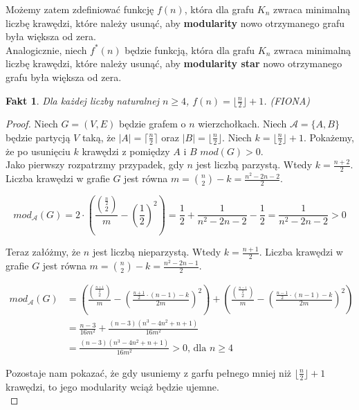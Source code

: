 \documentclass[letterpaper,12pt]{article}
\newtheorem{fact}{Fakt}
\begin{document}
  Możemy zatem zdefiniować funkcję \textbf{\(f(n)\)}, która dla grafu \(K_n\) zwraca minimalną liczbę krawędzi, które należy usunąć, aby \textbf{modularity} nowo otrzymanego grafu była większa od zera.\\

  Analogicznie, niech \textbf{\(f^*(n)\)} będzie funkcją, która dla grafu \(K_n\) zwraca minimalną liczbę krawędzi, które należy usunąć, aby \textbf{modularity star} nowo otrzymanego grafu była większa od zera.\\

  \begin{fact}
    Dla każdej liczby naturalnej \(n \geq 4\), \(f(n) = \lfloor\frac{n}{2}\rfloor + 1\). (FIONA)
  \end{fact}

  \begin{proof}
    Niech \(G=(V,E)\) będzie grafem o \(n\) wierzchołkach. Niech \(\mathcal{A} = \{A, B\}\) będzie partycją \(V\) taką, że \(|A| = \lceil\frac{n}{2}\rceil\) oraz \(|B| = \lfloor\frac{n}{2}\rfloor\). Niech \(k = \lfloor\frac{n}{2}\rfloor + 1\). Pokażemy, że po usunięciu \(k\) krawędzi z pomiędzy \(A\) i \(B\) \(mod(G) > 0\).\\

    Jako pierwszy rozpatrzmy przypadek, gdy \(n\) jest liczbą parzystą. Wtedy \(k = \frac{n+2}{2}\).
    Liczba krawędzi w grafie \(G\) jest równa \(m = {n\choose2} - k = \frac{n^2-2n-2}{2}\).

    \[mod_\mathcal{A}(G) = 2\cdot\left(\frac{{\frac{n}{2}\choose2}}{m} - {\left(\frac{1}{2}\right)}^2\right) = \frac{1}{2}+\frac{1}{n^2-2n-2}-\frac{1}{2}=\frac{1}{n^2-2n-2}>0\]

    Teraz załóżmy, że \(n\) jest liczbą nieparzystą. Wtedy \(k = \frac{n+1}{2}\). Liczba krawędzi w grafie \(G\) jest równa \(m = {n\choose2} - k = \frac{n^2-2n-1}{2}\).

    \begin{align*}
      mod_\mathcal{A}(G) &= \left(\frac{{\frac{n+1}{2}\choose2}}{m} - {\left(\frac{\frac{n+1}{2}\cdot(n-1)-k}{2m}\right)}^2\right) + \left(\frac{{\frac{n-1}{2}\choose2}}{m} - {\left(\frac{\frac{n-1}{2}\cdot(n-1)-k}{2m}\right)}^2\right) \\
      &= \frac{n-3}{16m^2} + \frac{(n-3)(n^3-4n^2+n+1)}{16m^2} \\
      &= \frac{(n-3)(n^3-4n^2+n+1)}{16m^2} > 0 \text{, dla } n \geq 4
    \end{align*}

    Pozostaje nam pokazać, że gdy usuniemy z garfu pełnego mniej niż \(\lfloor\frac{n}{2}\rfloor + 1\) krawędzi, to jego modularity wciąż będzie ujemne.\\
    

\end{proof}
\end{document}
